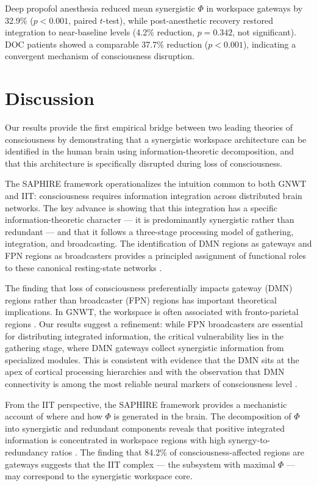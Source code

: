 \documentclass[11pt]{article}
\begin{document}
Deep propofol anesthesia reduced mean synergistic $\Phi$ in workspace gateways by 32.9\% ($p < 0.001$, paired $t$-test), while post-anesthetic recovery restored integration to near-baseline levels (4.2\% reduction, $p = 0.342$, not significant). DOC patients showed a comparable 37.7\% reduction ($p < 0.001$), indicating a convergent mechanism of consciousness disruption.

\section{Discussion}

Our results provide the first empirical bridge between two leading theories of consciousness by demonstrating that a synergistic workspace architecture can be identified in the human brain using information-theoretic decomposition, and that this architecture is specifically disrupted during loss of consciousness.

The SAPHIRE framework operationalizes the intuition common to both GNWT and IIT: consciousness requires information integration across distributed brain networks. The key advance is showing that this integration has a specific information-theoretic character --- it is predominantly synergistic rather than redundant --- and that it follows a three-stage processing model of gathering, integration, and broadcasting. The identification of DMN regions as gateways and FPN regions as broadcasters provides a principled assignment of functional roles to these canonical resting-state networks \citep{buckner2008brain, cole2013multi}.

The finding that loss of consciousness preferentially impacts gateway (DMN) regions rather than broadcaster (FPN) regions has important theoretical implications. In GNWT, the workspace is often associated with fronto-parietal regions \citep{dehaene2011experimental, mashour2020conscious}. Our results suggest a refinement: while FPN broadcasters are essential for distributing integrated information, the critical vulnerability lies in the gathering stage, where DMN gateways collect synergistic information from specialized modules. This is consistent with evidence that the DMN sits at the apex of cortical processing hierarchies \citep{margulies2016situating} and with the observation that DMN connectivity is among the most reliable neural markers of consciousness level \citep{demertzi2019human}.

From the IIT perspective, the SAPHIRE framework provides a mechanistic account of where and how $\Phi$ is generated in the brain. The decomposition of $\Phi$ into synergistic and redundant components reveals that positive integrated information is concentrated in workspace regions with high synergy-to-redundancy ratios \citep{luppi2022synergistic}. The finding that 84.2\% of consciousness-affected regions are gateways suggests that the IIT complex --- the subsystem with maximal $\Phi$ --- may correspond to the synergistic workspace core.
\end{document}
